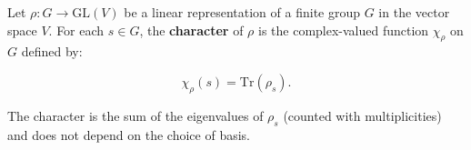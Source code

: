 Let $\rho: G \to \text{GL}(V)$ be a linear representation of a finite group $G$ in the vector space $V$. For each $s \in G$, the \textbf{character} of $\rho$ is the complex-valued function $\chi_\rho$ on $G$ defined by:

$$\chi_\rho(s) = \text{Tr}(\rho_s).$$

The character is the sum of the eigenvalues of $\rho_s$ (counted with multiplicities) and does not depend on the choice of basis.

